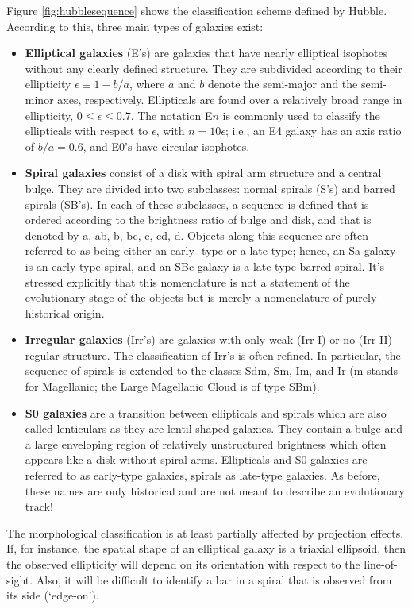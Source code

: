 \documentclass[a4paper,10pt]{article}
\begin{document}
{\noindent}Figure \ref{fig:hubblesequence} shows the classification scheme defined by Hubble. According to this, three main types of galaxies exist:

\begin{itemize}
    \item \textbf{Elliptical galaxies} (E's) are galaxies that have nearly elliptical isophotes without any clearly defined structure. They are subdivided according to their ellipticity $\epsilon\equiv1-b/a$, where $a$ and $b$ denote the semi-major and the semi-minor axes, respectively. Ellipticals are found over a relatively broad range in ellipticity, $0\leq\epsilon\leq0.7$. The notation E$n$ is commonly used to classify the ellipticals with respect to $\epsilon$, with $n=10\epsilon$; i.e., an E4 galaxy has an axis ratio of $b/a=0.6$, and E0's have circular isophotes.
    \item \textbf{Spiral galaxies} consist of a disk with spiral arm structure and a central bulge. They are divided into two subclasses: normal spirals (S's) and barred spirals (SB's). In each of these subclasses, a sequence is defined that is ordered according to the brightness ratio of bulge and disk, and that is denoted by a, ab, b, bc, c, cd, d. Objects along this sequence are often referred to as being either an early- type or a late-type; hence, an Sa galaxy is an early-type spiral, and an SBc galaxy is a late-type barred spiral. It's stressed explicitly that this nomenclature is not a statement of the evolutionary stage of the objects but is merely a nomenclature of purely historical origin.
    \item \textbf{Irregular galaxies} (Irr's) are galaxies with only weak (Irr I) or no (Irr II) regular structure. The classification of Irr's is often refined. In particular, the sequence of spirals is extended to the classes Sdm, Sm, Im, and Ir (m stands for Magellanic; the Large Magellanic Cloud is of type SBm).
    \item \textbf{S0 galaxies} are a transition between ellipticals and spirals which are also called lenticulars as they are lentil-shaped galaxies. They contain a bulge and a large enveloping region of relatively unstructured brightness which often appears like a disk without spiral arms. Ellipticals and S0 galaxies are referred to as early-type galaxies, spirals as late-type galaxies. As before, these names are only historical and are not meant to describe an evolutionary track!
\end{itemize}

{\noindent}The morphological classification is at least partially affected by projection effects. If, for instance, the spatial shape of an elliptical galaxy is a triaxial ellipsoid, then the observed ellipticity will depend on its orientation with respect to the line-of-sight. Also, it will be difficult to identify a bar in a spiral that is observed from its side (`edge-on').
\end{document}
